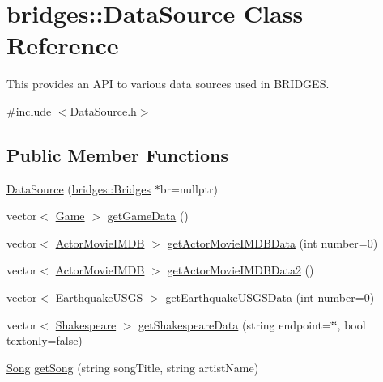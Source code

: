 \hypertarget{classbridges_1_1_data_source}{}\section{bridges\+:\+:Data\+Source Class Reference}
\label{classbridges_1_1_data_source}


This provides an A\+P\+I to various data sources used in B\+R\+I\+D\+G\+E\+S.  




{\ttfamily \#include $<$Data\+Source.\+h$>$}

\subsection*{Public Member Functions}
\begin{DoxyCompactItemize}
\item 
\hyperlink{classbridges_1_1_data_source_afc95b52d2ca03a92c1f1ee1594a097c7}{Data\+Source} (\hyperlink{classbridges_1_1_bridges}{bridges\+::\+Bridges} $\ast$br=nullptr)
\item 
vector$<$ \hyperlink{classbridges_1_1_game}{Game} $>$ \hyperlink{classbridges_1_1_data_source_aa902e1dffd4169e2f6e6820299b8cde1}{get\+Game\+Data} ()
\item 
vector$<$ \hyperlink{classbridges_1_1_actor_movie_i_m_d_b}{Actor\+Movie\+I\+M\+D\+B} $>$ \hyperlink{classbridges_1_1_data_source_a664694136550312ab3f5a82bebb91bca}{get\+Actor\+Movie\+I\+M\+D\+B\+Data} (int number=0)
\item 
vector$<$ \hyperlink{classbridges_1_1_actor_movie_i_m_d_b}{Actor\+Movie\+I\+M\+D\+B} $>$ \hyperlink{classbridges_1_1_data_source_a00f0a0a1871d4864c6ccdd04195e0fb2}{get\+Actor\+Movie\+I\+M\+D\+B\+Data2} ()
\item 
vector$<$ \hyperlink{classbridges_1_1_earthquake_u_s_g_s}{Earthquake\+U\+S\+G\+S} $>$ \hyperlink{classbridges_1_1_data_source_a6645e2029915550fcac5f9fed7870119}{get\+Earthquake\+U\+S\+G\+S\+Data} (int number=0)
\item 
vector$<$ \hyperlink{classbridges_1_1_shakespeare}{Shakespeare} $>$ \hyperlink{classbridges_1_1_data_source_a7502065879fed9a952ba1cf0c0c74185}{get\+Shakespeare\+Data} (string endpoint=\char`\"{}\char`\"{}, bool textonly=false)
\item 
\hyperlink{classbridges_1_1_song}{Song} \hyperlink{classbridges_1_1_data_source_a284c9d572415b67df6989ab8ab97d0e2}{get\+Song} (string song\+Title, string artist\+Name)
\item 

\end{DoxyCompactItemize}

